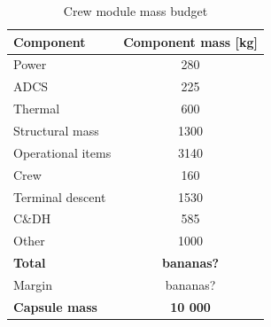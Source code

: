 \begin{table}[h]
\centering
\caption{Crew module mass budget}
\label{tab:crewmass}
\begin{tabular}{|l|c|}
\hline
{\bf Component}    & {\bf Component mass {[}kg{]}} \\ \hline \hline
Power              & 280                           \\ \hline
 ADCS        &  225                     \\ \hline
Thermal            & 600                           \\ \hline
Structural mass    & 1300                          \\ \hline
Operational items  & 3140                          \\ \hline
Crew               & 160                           \\ \hline
Terminal descent   & 1530                          \\ \hline
C\&DH              & 585                           \\ \hline 
Other    & 1000                          \\ \hline \hline
\textbf{Total}    & \textbf{bananas?}                          \\ \hline \hline
Margin    & bananas?                        \\ \hline \hline
{\bf Capsule mass} & {\bf 10 000}                    \\ \hline
\end{tabular}
\end{table}


